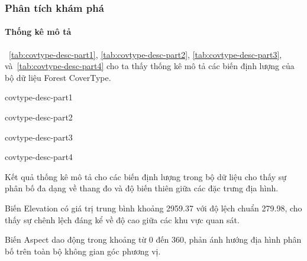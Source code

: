 \subsubsection{Phân tích khám phá}

\paragraph{Thống kê mô tả}

\tablename~\ref{tab:covtype-desc-part1}, \ref{tab:covtype-desc-part2},
\ref{tab:covtype-desc-part3}, và~\ref{tab:covtype-desc-part4} cho ta thấy thống
kê mô tả các biến định lượng của bộ dữ liệu Forest CoverType.

\begin{table}[htbp]
  \centering
  \caption{Thống kê mô tả các biến định lượng của bộ dữ liệu Forest CoverType
  (phần 1)}
  \label{tab:covtype-desc-part1}
  {covtype-desc-part1}
\end{table}

\begin{table}[htbp]
  \centering
  \caption{Thống kê mô tả các biến định lượng của bộ dữ liệu Forest CoverType
  (phần 2)}
  \label{tab:covtype-desc-part2}
  {covtype-desc-part2}
\end{table}

\begin{table}[htbp]
  \centering
  \caption{Thống kê mô tả các biến định lượng của bộ dữ liệu Forest CoverType
  (phần 3)}
  \label{tab:covtype-desc-part3}
  {covtype-desc-part3}
\end{table}

\begin{table}[htbp]
  \centering
  \caption{Thống kê mô tả các biến định lượng của bộ dữ liệu Forest CoverType
  (phần 4)}
  \label{tab:covtype-desc-part4}
  {covtype-desc-part4}
\end{table}

Kết quả thống kê mô tả cho các biến định lượng trong bộ dữ liệu cho thấy sự
phân bố đa dạng về thang đo và độ biến thiên giữa các đặc trưng địa hình.

Biến \textenglish{Elevation} có giá trị trung bình khoảng 2959.37 với độ lệch
chuẩn 279.98, cho thấy sự chênh lệch đáng kể về độ cao giữa các khu vực quan
sát.

Biến \textenglish{Aspect} dao động trong khoảng từ 0 đến 360, phản ánh hướng
địa hình phân bố trên toàn bộ không gian góc phương vị.


